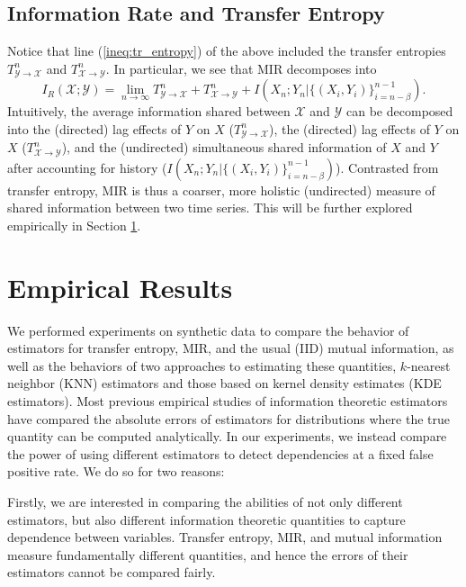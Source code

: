 \documentclass{article} %
\newcommand{\X}{\mathcal{X}}                        %
\newcommand{\Y}{\mathcal{Y}}                        %
\begin{document}
\subsection{Information Rate and Transfer Entropy}
Notice that line (\ref{ineq:tr_entropy}) of the above included the transfer
entropies $T_{\Y \to \X}^n$ and $T_{\X \to \Y}^n$. In particular, we see that
MIR decomposes into
\[I_R(\X;\Y)
    = \lim_{n \to \infty} T_{\Y \to \X}^n + T_{\X \to \Y}^n
                    + I(X_n; Y_n | \{(X_i,Y_i)\}_{i = n - \beta}^{n - 1}).\]
Intuitively, the average information shared between $\X$ and $\Y$ can be
decomposed into the (directed) lag effects of $Y$ on $X$ ($T_{\Y \to \X}^n$),
the (directed) lag effects of $Y$ on $X$ ($T_{\X \to \Y}^n$), and the
(undirected) simultaneous shared information of $X$ and $Y$ after accounting
for history ($I(X_n; Y_n | \{(X_i,Y_i)\}_{i = n - \beta}^{n - 1})$). Contrasted
from transfer entropy, MIR is thus a coarser, more holistic (undirected)
measure of shared information between two time series. This will be further
explored empirically in Section \ref{sec:empirical}.

\section{Empirical Results}
\label{sec:empirical}
We performed experiments on synthetic data to compare the behavior of
estimators for transfer entropy, MIR, and the usual (IID) mutual information,
as well as the behaviors of two approaches to estimating these quantities,
$k$-nearest neighbor (KNN) estimators and those based on kernel density
estimates (KDE estimators).
Most previous empirical studies of information theoretic estimators
\citep{singh14densityfunc,krishnamurthy14divergences,pal2010estimation,
			  moon14ensemble,gao2014stronglyDependent}
have compared the absolute errors of estimators for distributions where the
true quantity can be computed analytically. In our experiments, we instead
compare the power of using different estimators to detect dependencies at a
fixed false positive rate. We do so for two reasons:

Firstly, we are interested in comparing the abilities of not only different
estimators, but also different information theoretic quantities to capture
dependence between variables. Transfer entropy, MIR, and mutual information
measure fundamentally different quantities, and hence the errors of their
estimators cannot be compared fairly.
\end{document}
